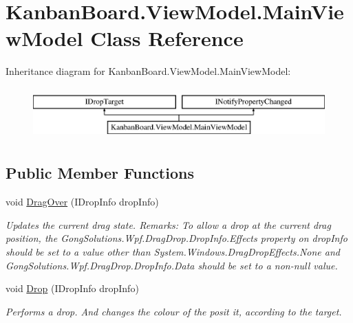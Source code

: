 \hypertarget{class_kanban_board_1_1_view_model_1_1_main_view_model}{}\section{Kanban\+Board.\+View\+Model.\+Main\+View\+Model Class Reference}
\label{class_kanban_board_1_1_view_model_1_1_main_view_model}
Inheritance diagram for Kanban\+Board.\+View\+Model.\+Main\+View\+Model\+:\begin{figure}[H]
\begin{center}
\leavevmode
\includegraphics[height=2.000000cm]{class_kanban_board_1_1_view_model_1_1_main_view_model}
\end{center}
\end{figure}
\subsection*{Public Member Functions}
\begin{DoxyCompactItemize}
\item 
void \hyperlink{class_kanban_board_1_1_view_model_1_1_main_view_model_afeac47ff8c81ee187966b321dcd0adfd}{Drag\+Over} (I\+Drop\+Info drop\+Info)
\begin{DoxyCompactList}\small\item\em Updates the current drag state. Remarks\+: To allow a drop at the current drag position, the Gong\+Solutions.\+Wpf.\+Drag\+Drop.\+Drop\+Info.\+Effects property on drop\+Info should be set to a value other than System.\+Windows.\+Drag\+Drop\+Effects.\+None and Gong\+Solutions.\+Wpf.\+Drag\+Drop.\+Drop\+Info.\+Data should be set to a non-\/null value. \end{DoxyCompactList}\item 
void \hyperlink{class_kanban_board_1_1_view_model_1_1_main_view_model_a8a289987889845510435516f3699495c}{Drop} (I\+Drop\+Info drop\+Info)
\begin{DoxyCompactList}\small\item\em Performs a drop. And changes the colour of the posit it, according to the target. \end{DoxyCompactList}\end{DoxyCompactItemize}
